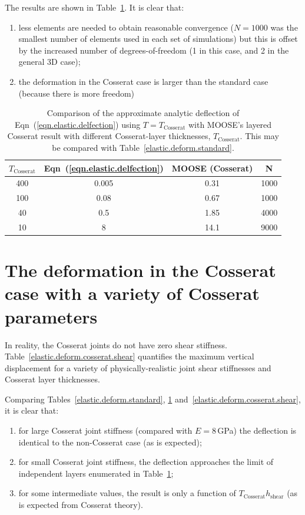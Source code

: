 \documentclass[]{scrreprt}
\begin{document}
The results are shown in Table~\ref{elastic.deform.cosserat}.  It is
clear that:
\begin{enumerate}
\item less elements are needed to obtain reasonable convergence
($N=1000$ was the smallest number of elements used in each set of
  simulations) but this is offset by the increased number of
  degrees-of-freedom (1 in this case, and 2 in the general 3D case);
\item the deformation in the Cosserat case is larger than the standard
  case (because there is more freedom)
\end{enumerate}

\begin{table}[htb]
\begin{center}
\begin{tabular}{cccc}
  $T_{\mathrm{Cosserat}}$  & Eqn~(\ref{eqn.elastic.delfection}) &
  MOOSE (Cosserat) & N \\
  \hline
  400 & 0.005 & 0.31 & 1000 \\
  100 & 0.08 & 0.67 & 1000 \\
  40 & 0.5 & 1.85 & 4000 \\
  10 & 8 & 14.1 & 9000 \\
\end{tabular}
\caption{Comparison of the approximate analytic deflection of
  Eqn~(\ref{eqn.elastic.delfection}) using $T=T_{\mathrm{Cosserat}}$
  with MOOSE's layered Cosserat result with different Cosserat-layer
  thicknesses, $T_{\mathrm{Cosserat}}$.  This may be compared with
  Table~\ref{elastic.deform.standard}.}
\label{elastic.deform.cosserat}
\end{center}
\end{table}

\section{The deformation in the Cosserat case with a variety of Cosserat parameters}

In reality, the Cosserat joints do not have zero shear stiffness.
Table~\ref{elastic.deform.cosserat.shear} quantifies the maximum
vertical displacement for a variety of physically-realistic joint
shear stiffnesses and Cosserat layer thicknesses.

Comparing Tables~\ref{elastic.deform.standard},
\ref{elastic.deform.cosserat} and~\ref{elastic.deform.cosserat.shear},
it is clear that:
\begin{enumerate}
\item for large Cosserat joint stiffness (compared with $E=8$\,GPa)
  the deflection is identical to the non-Cosserat case (as is
  expected);
\item for small Cosserat joint stiffness, the deflection approaches
  the limit of independent layers enumerated in
  Table~\ref{elastic.deform.cosserat};
\item for some intermediate values, the result is only a function of
  $T_{\mathrm{Cosserat}}h_{\mathrm{shear}}$ (as is expected from
  Cosserat theory).
\end{enumerate}
\end{document}

